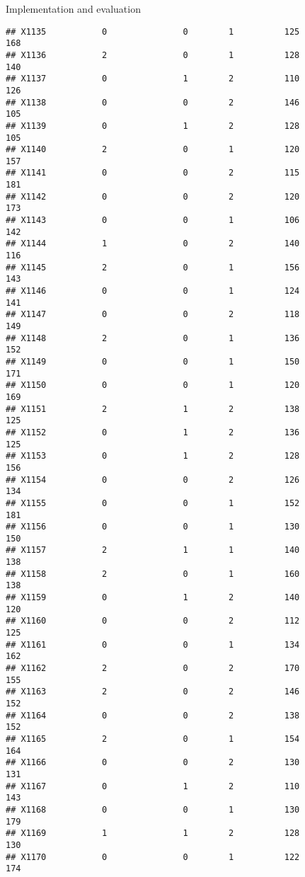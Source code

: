 \documentclass[
  ignorenonframetext,
]{beamer}
\begin{document}
\begin{frame}[fragile]{Implementation and evaluation}
\begin{verbatim}
## X1135           0               0        1          125            168
## X1136           2               0        1          128            140
## X1137           0               1        2          110            126
## X1138           0               0        2          146            105
## X1139           0               1        2          128            105
## X1140           2               0        1          120            157
## X1141           0               0        2          115            181
## X1142           0               0        2          120            173
## X1143           0               0        1          106            142
## X1144           1               0        2          140            116
## X1145           2               0        1          156            143
## X1146           0               0        1          124            141
## X1147           0               0        2          118            149
## X1148           2               0        1          136            152
## X1149           0               0        1          150            171
## X1150           0               0        1          120            169
## X1151           2               1        2          138            125
## X1152           0               1        2          136            125
## X1153           0               1        2          128            156
## X1154           0               0        2          126            134
## X1155           0               0        1          152            181
## X1156           0               0        1          130            150
## X1157           2               1        1          140            138
## X1158           2               0        1          160            138
## X1159           0               1        2          140            120
## X1160           0               0        2          112            125
## X1161           0               0        1          134            162
## X1162           2               0        2          170            155
## X1163           2               0        2          146            152
## X1164           0               0        2          138            152
## X1165           2               0        1          154            164
## X1166           0               0        2          130            131
## X1167           0               1        2          110            143
## X1168           0               0        1          130            179
## X1169           1               1        2          128            130
## X1170           0               0        1          122            174

\end{verbatim}
\end{frame}
\end{document}
